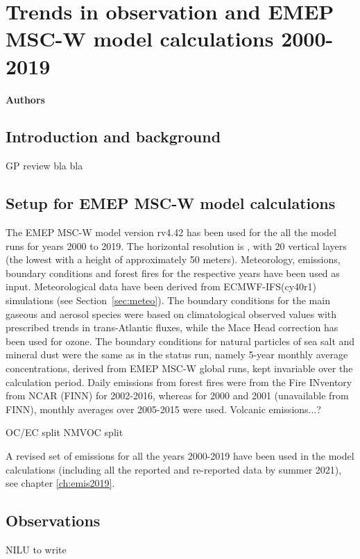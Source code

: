 \chapter[Trends]{Trends in observation and EMEP MSC-W model calculations 2000-2019}
\label{ch:Trends}

{\bf{Authors}}\\


\section{\label{sec:Trends_introduction}Introduction and background}
GP review bla bla


\section{\label{EMEPmodelcalc}{Setup for EMEP MSC-W model calculations}}
The EMEP MSC-W model version rv4.42 has been used for the all the model runs for years 2000 to 2019. The horizontal resolution is \resZO, with 20 vertical layers (the lowest with a height of approximately 50 meters).
 Meteorology, emissions, boundary conditions and forest fires for the respective years have been used as input. Meteorological data have been
 derived from ECMWF-IFS(cy40r1) simulations (see Section~\ref{sec:meteo}). 
 The boundary conditions for the main gaseous and aerosol species were based on climatological observed values with prescribed trends in trans-Atlantic fluxes, while the Mace
Head correction has been used for ozone. The boundary conditions for natural particles of
sea salt and mineral dust were the same as in the status run, namely 5-year monthly average
concentrations, derived from EMEP MSC-W global runs, kept invariable over the calculation
period.
Daily emissions from forest fires were from the Fire INventory from NCAR (FINN) for 2002-2016,
whereas for 2000 and 2001 (unavailable from FINN), monthly averages over 2005-2015 were
used.
 Volcanic emissions...?
 
 OC/EC split
 NMVOC split
 
A revised set of emissions for all the years 2000-2019 have been used in the model calculations (including all the reported and re-reported data by summer 2021), see chapter \ref{ch:emis2019}.

\section{\label{OBSTrends}{Observations}} NILU to write

